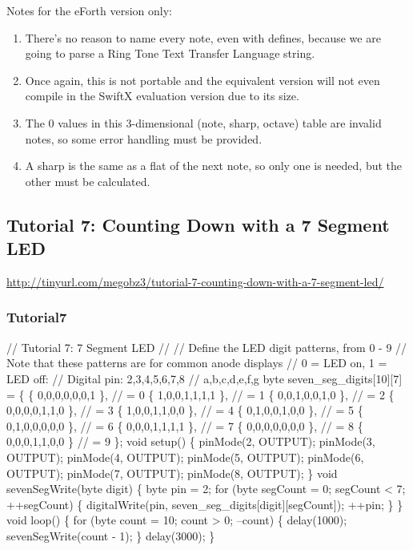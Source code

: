 \documentclass[10pt,english]{article}
\begin{document}
Notes for the eForth version only:
\begin{enumerate}
\item There's no reason to name every note, even with defines, because we
are going to parse a Ring Tone Text Transfer Language string.
\item Once again, this is not portable and the equivalent version will not
even compile in the SwiftX evaluation version due to its size.
\item The 0 values in this 3-dimensional (note, sharp, octave) table are
invalid notes, so some error handling must be provided.
\item A sharp is the same as a flat of the next note, so only one is needed,
but the other must be calculated.
\end{enumerate}

\subsection{Tutorial 7: Counting Down with a 7 Segment LED}

\url{http://tinyurl.com/megobz3/tutorial-7-counting-down-with-a-7-segment-led/}


\subsubsection{Tutorial7}

\nwenddocs{}\endmoddef
//  Tutorial 7: 7 Segment LED
//
// Define the LED digit patterns, from 0 - 9
// Note that these patterns are for common anode displays
// 0 = LED on, 1 = LED off:
// Digital pin: 2,3,4,5,6,7,8
//              a,b,c,d,e,f,g
byte seven_seg_digits[10][7] = \{ \{ 0,0,0,0,0,0,1 \},  // = 0
                                 \{ 1,0,0,1,1,1,1 \},  // = 1
                                 \{ 0,0,1,0,0,1,0 \},  // = 2
                                 \{ 0,0,0,0,1,1,0 \},  // = 3
                                 \{ 1,0,0,1,1,0,0 \},  // = 4
                                 \{ 0,1,0,0,1,0,0 \},  // = 5
                                 \{ 0,1,0,0,0,0,0 \},  // = 6
                                 \{ 0,0,0,1,1,1,1 \},  // = 7
                                 \{ 0,0,0,0,0,0,0 \},  // = 8
                                 \{ 0,0,0,1,1,0,0 \}   // = 9
                               \};
void setup() \{
  pinMode(2, OUTPUT);
  pinMode(3, OUTPUT);
  pinMode(4, OUTPUT);
  pinMode(5, OUTPUT);
  pinMode(6, OUTPUT);
  pinMode(7, OUTPUT);
  pinMode(8, OUTPUT); \}
void sevenSegWrite(byte digit) \{
  byte pin = 2;
  for (byte segCount = 0; segCount < 7; ++segCount) \{
    digitalWrite(pin, seven_seg_digits[digit][segCount]);
    ++pin;
  \}
\}
void loop() \{
  for (byte count = 10; count > 0; --count) \{
   delay(1000);
   sevenSegWrite(count - 1);
  \}
  delay(3000);
\}
\nwendcode{}\nwdocspar
\end{document}

